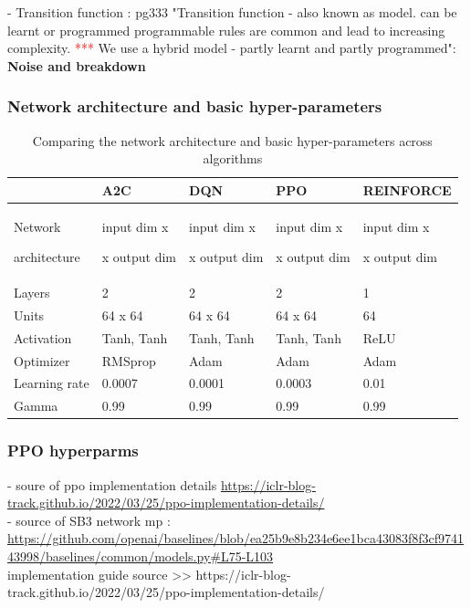 \documentclass[a4paper, 12pt]{article}
\newcommand{\rowspace}[1]{\renewcommand{\arraystretch}{#1}}
\begin{document}
- Transition function \citep{graesser2019}: pg333 "Transition function  - also known as model. can be learnt or programmed programmable rules are common and lead to increasing complexity. \textcolor{red}{***} We use a hybrid model - partly learnt and partly programmed": \textbf{Noise and breakdown}\\

\subsubsection{Network architecture and basic hyper-parameters}

\begin{table}\centering
	\sffamily
	\rowspace{1.5}
	\begin{tabular}{L{2cm} R{2.5cm} R{2.5cm} R{2.5cm} R{3cm}}
		\toprule
		&\textbf{A2C}&\textbf{DQN}&\textbf{PPO}&\textbf{REINFORCE}\\ \midrule
		
		Network\par architecture&input dim x\par [64|Tanh x 64|Tanh]\par x output dim&input dim x\par [64|Tanh x 64|Tanh]\par x output dim&input dim x\par [64|Tanh x 64|Tanh]\par x output dim&input dim x\par [64|ReLU]\par x output dim\\
		Layers&2&2&2&1\\
		Units&64  x 64&64  x 64&64  x 64&64\\
		Activation&Tanh, Tanh&Tanh, Tanh&Tanh, Tanh&ReLU\\
		Optimizer&RMSprop&Adam&Adam&Adam\\ \midrule
		Learning rate&0.0007&0.0001&0.0003&0.01\\
		Gamma&0.99&0.99&0.99&0.99\\			
		\bottomrule
	\end{tabular}
	\caption{Comparing the network architecture and basic hyper-parameters across algorithms}
	\label{tbl:network-architecture}
\end{table}

\subsubsection{PPO hyperparms}
- soure of ppo implementation details \url{https://iclr-blog-track.github.io/2022/03/25/ppo-implementation-details/}\\
- source of SB3 network mp : \url{https://github.com/openai/baselines/blob/ea25b9e8b234e6ee1bca43083f8f3cf974143998/baselines/common/models.py#L75-L103}\\
implementation guide source >> https://iclr-blog-track.github.io/2022/03/25/ppo-implementation-details/
\end{document}
